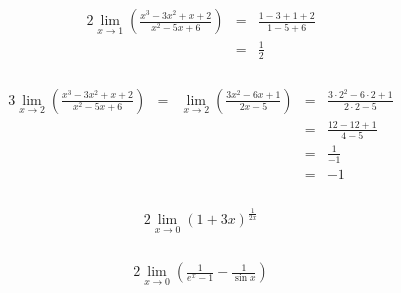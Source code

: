 \documentclass[10pt,a4paper,oneside,ngerman,numbers=noenddot]{scrartcl}
\begin{document}
\section{} %
\subsubsection{} %
\begin{alignat*}{2}
\lim\limits_{x \rightarrow 1} \left(\frac{x^{3}-3x^{2}+x+2}{x^{2}-5x+6} \right) &=& \frac{1-3+1+2}{1-5+6} \\
&=& \frac{1}{2}
\end{alignat*}
\subsubsection{} %
\begin{alignat*}{3}
\lim\limits_{x \rightarrow 2} \left(\frac{x^{3}-3x^{2}+x+2}{x^{2}-5x+6} \right) &=& \lim\limits_{x \rightarrow 2} \left(\frac{3x^{2} - 6x + 1}{2x - 5} \right) &=& \frac{3 \cdot 2^{2} - 6 \cdot 2 + 1}{2 \cdot 2 - 5} \\
&& &=& \frac{12 - 12 + 1}{4 - 5} \\
&& &=& \frac{1}{-1} \\
&& &=& -1
\end{alignat*}
\subsubsection{} %
\begin{alignat*}{2}
\lim\limits_{x \rightarrow 0} (1+3x)^{\frac{1}{2x}}
\end{alignat*}
\subsubsection{} %
\begin{alignat*}{2}
\lim\limits_{x \rightarrow 0} \left(\frac{1}{e^{x} - 1} - \frac{1}{\sin x} \right)
\end{alignat*}
\section{} %
\end{document}
